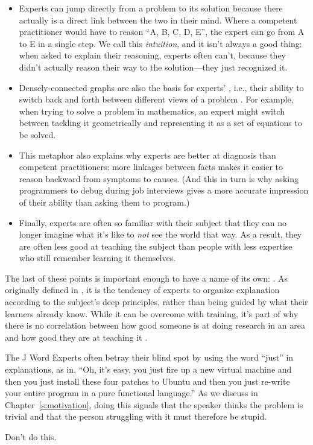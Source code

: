 \begin{itemize}
\item
  Experts can jump directly from a problem to its solution because
  there actually is a direct link between the two in their mind. Where
  a competent practitioner would have to reason ``A, B, C, D, E'', the
  expert can go from A to E in a single step. We call this
  \emph{intuition}, and it isn't always a good thing: when asked to explain
  their reasoning, experts often can't, because they didn't actually
  reason their way to the solution---they just recognized it.
\item
  Densely-connected graphs are also the basis for experts'
  , i.e.,
  their ability to switch back and forth between different views of a
  problem \cite{Petr2016}. For example, when trying to solve a
  problem in mathematics, an expert might switch between tackling it
  geometrically and representing it as a set of equations to be
  solved.
\item
  This metaphor also explains why experts are better at diagnosis than
  competent practitioners: more linkages between facts makes it easier
  to reason backward from symptoms to causes. (And this in turn is why
  asking programmers to debug during job interviews gives a more
  accurate impression of their ability than asking them to program.)
\item
  Finally, experts are often so familiar with their subject that they
  can no longer imagine what it's like to \emph{not} see the world that
  way. As a result, they are often less good at teaching the subject
  than people with less expertise who still remember learning it
  themselves.
\end{itemize}

The last of these points is important enough to have a name of its own:
. As originally
defined in \cite{Nath2003}, it is the tendency of experts to organize
explanation according to the subject's deep principles, rather than
being guided by what their learners already know. While it can be
overcome with training, it's part of why there is no correlation between
how good someone is at doing research in an area and how good they are
at teaching it \cite{Mars2002}.

\begin{aside}{The J Word}
  Experts often betray their blind spot by using the word ``just'' in
  explanations, as in, ``Oh, it's easy, you just fire up a new virtual
  machine and then you just install these four patches to Ubuntu and
  then you just re-write your entire program in a pure functional
  language.'' As we discuss in Chapter~\ref{s:motivation}, doing this
  signals that the speaker thinks the problem is trivial and that the
  person struggling with it must therefore be stupid.

  Don't do this.
\end{aside}


